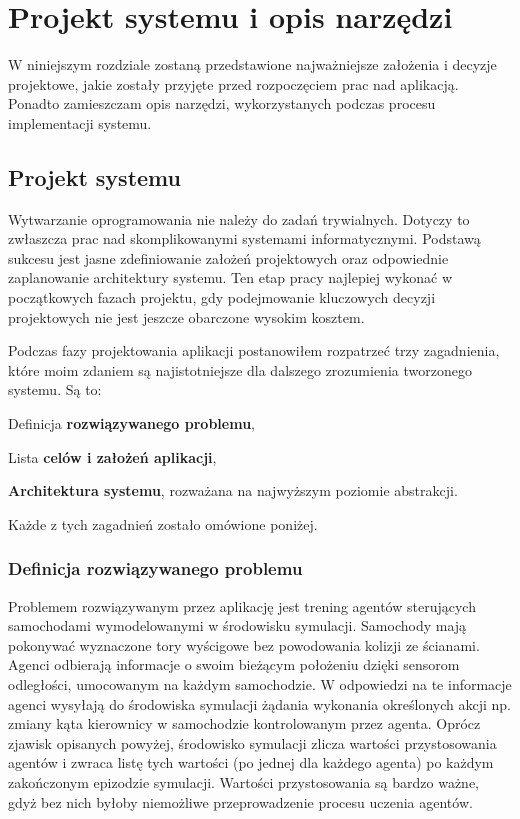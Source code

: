 \chapter{Projekt systemu i opis narzędzi}
W niniejszym rozdziale zostaną przedstawione najważniejsze założenia i decyzje projektowe, jakie zostały przyjęte przed rozpoczęciem prac nad aplikacją. Ponadto zamieszczam opis narzędzi, wykorzystanych podczas procesu implementacji systemu.

\section{Projekt systemu}
Wytwarzanie oprogramowania nie należy do zadań trywialnych. Dotyczy to zwłaszcza prac nad skomplikowanymi systemami informatycznymi. Podstawą sukcesu jest jasne zdefiniowanie założeń projektowych oraz odpowiednie zaplanowanie architektury systemu. Ten etap pracy najlepiej wykonać w początkowych fazach projektu, gdy podejmowanie kluczowych decyzji projektowych nie jest jeszcze obarczone wysokim kosztem.

Podczas fazy projektowania aplikacji postanowiłem rozpatrzeć trzy zagadnienia, które moim zdaniem są najistotniejsze dla dalszego zrozumienia tworzonego systemu. Są to:
\begin{enumerate*}
\item Definicja \textbf{rozwiązywanego problemu},
\item Lista \textbf{celów i założeń aplikacji},
\item \textbf{Architektura systemu}, rozważana na najwyższym poziomie abstrakcji.
\end{enumerate*}

Każde z tych zagadnień zostało omówione poniżej.

\subsection{Definicja rozwiązywanego problemu}
Problemem rozwiązywanym przez aplikację jest trening agentów sterujących samochodami wymodelowanymi w środowisku symulacji. Samochody mają pokonywać wyznaczone tory wyścigowe bez powodowania kolizji ze ścianami. Agenci odbierają informacje o swoim bieżącym położeniu dzięki sensorom odległości, umocowanym na każdym samochodzie. W odpowiedzi na te informacje agenci wysyłają do środowiska symulacji żądania wykonania określonych akcji np. zmiany kąta kierownicy w samochodzie kontrolowanym przez agenta. Oprócz zjawisk opisanych powyżej, środowisko symulacji zlicza wartości przystosowania agentów i zwraca listę tych wartości (po jednej dla każdego agenta) po każdym zakończonym epizodzie symulacji. Wartości przystosowania są bardzo ważne, gdyż bez nich byłoby niemożliwe przeprowadzenie procesu uczenia agentów.

